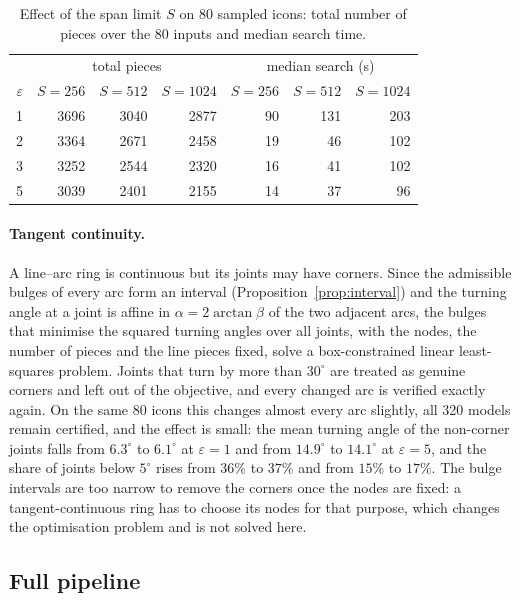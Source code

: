 \documentclass[11pt,a4paper]{article}
\theoremstyle{definition}
\theoremstyle{remark}
\begin{document}
\begin{table}[h]
\centering
\caption{Effect of the span limit $S$ on 80 sampled icons: total number of
pieces over the 80 inputs and median search time.}
\label{tab:span}
\begin{tabular}{rrrrrrr}
\toprule
 & \multicolumn{3}{c}{total pieces} & \multicolumn{3}{c}{median search (s)}\\
$\varepsilon$ & $S=256$ & $S=512$ & $S=1024$ & $S=256$ & $S=512$ & $S=1024$\\
\midrule
1 & 3696 & 3040 & 2877 & 90 & 131 & 203\\
2 & 3364 & 2671 & 2458 & 19 & 46 & 102\\
3 & 3252 & 2544 & 2320 & 16 & 41 & 102\\
5 & 3039 & 2401 & 2155 & 14 & 37 & 96\\
\bottomrule
\end{tabular}
\end{table}

\paragraph{Tangent continuity.} A line--arc ring is continuous but its
joints may have corners. Since the admissible bulges of every arc form an
interval (Proposition~\ref{prop:interval}) and the turning angle at a joint
is affine in $\alpha=2\arctan\beta$ of the two adjacent arcs, the bulges that
minimise the squared turning angles over all joints, with the nodes, the
number of pieces and the line pieces fixed, solve a box-constrained linear
least-squares problem. Joints that turn by more than $30^\circ$ are treated
as genuine corners and left out of the objective, and every changed arc is
verified exactly again. On the same 80 icons this changes almost every arc
slightly, all 320 models remain certified, and the effect is small: the
mean turning angle of the non-corner joints falls from $6.3^\circ$ to
$6.1^\circ$ at $\varepsilon=1$ and from $14.9^\circ$ to $14.1^\circ$ at
$\varepsilon=5$, and the share of joints below $5^\circ$ rises from $36\%$ to
$37\%$ and from $15\%$ to $17\%$. The bulge intervals are too narrow to
remove the corners once the nodes are fixed: a tangent-continuous ring has to
choose its nodes for that purpose, which changes the optimisation problem
and is not solved here.

\subsection{Full pipeline}
\end{document}
